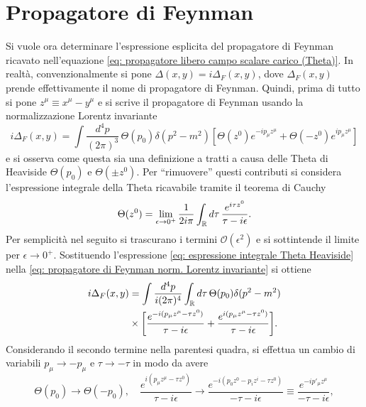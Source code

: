 \section{Propagatore di Feynman}
Si vuole ora determinare l'espressione esplicita del propagatore di Feynman ricavato nell'equazione \eqref{eq: propagatore libero campo scalare carico (Theta)}. In realtà, convenzionalmente si pone $\Delta(x,y) = i\Delta_F(x,y)$, dove $\Delta_F(x,y)$ prende effettivamente il nome di propagatore di Feynman. Quindi, prima di tutto si pone $z^\mu \equiv x^\mu - y^\mu$ e si scrive il propagatore di Feynman usando la normalizzazione Lorentz invariante
\begin{equation}
\label{eq: propagatore di Feynman norm. Lorentz invariante}
    i\Delta_F(x,y) = \int \frac{d^4p}{(2\pi)^3}\,\Theta(p_0)\delta(p^2 - m^2)[\Theta(z^0)e^{-ip_\mu z^\mu} + \Theta(-z^0)e^{ip_\mu z^\mu}]
\end{equation}
e si osserva come questa sia una definizione a tratti a causa delle Theta di Heaviside $\Theta(p_0)$ e $\Theta(\pm z^0)$. Per ``rimuovere'' questi contributi si considera l'espressione integrale della Theta ricavabile tramite il teorema di Cauchy
\begin{equation}
\label{eq: espressione integrale Theta Heaviside}
    \Theta(z^0) = \lim_{\epsilon\to0^+}\frac{1}{2i\pi}\int_{\mathbb{R}} d\tau\,\frac{e^{i\tau z^0}}{\tau - i\epsilon}.
\end{equation}
Per semplicità nel seguito si trascurano i termini $\mathcal{O}(\epsilon^2)$ e si sottintende il limite per $\epsilon\to0^+$. Sostituendo l'espressione \eqref{eq: espressione integrale Theta Heaviside} nella \eqref{eq: propagatore di Feynman norm. Lorentz invariante} si ottiene
\begin{equation}
    \begin{split}
        i\Delta_F(x,y) &= \int \frac{d^4p}{i(2\pi)^4}\int_{\mathbb{R}} d\tau\,\Theta(p_0)\delta(p^2 - m^2) \\
        &\times\bigg[\frac{e^{-i(p_\mu z^\mu - \tau z^0)}}{\tau - i\epsilon} + \frac{e^{i(p_\mu z^\mu - \tau z^0)}}{\tau - i\epsilon}\bigg].
    \end{split}
\end{equation}
Considerando il secondo termine nella parentesi quadra, si effettua un cambio di variabili $p_\mu \to -p_\mu$ e $\tau \to -\tau$ in modo da avere
\begin{equation}
    \Theta(p_0) \to \Theta(-p_0),\quad 
        \dfrac{e^{i(p_\mu z^\mu - \tau z^0)}}{\tau - i\epsilon} \to \dfrac{e^{-i(p_0z^0 - p_i z^i - \tau z^0)}}{-\tau - i\epsilon} \equiv \dfrac{e^{-ip'_\mu z^\mu}}{-\tau - i\epsilon},
\end{equation}
